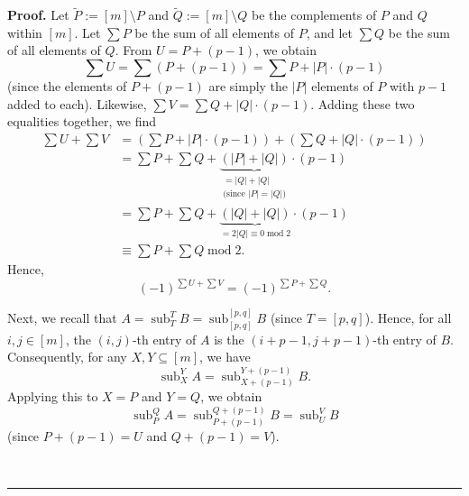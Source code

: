 \documentclass[numbers=enddot,12pt,final,onecolumn,notitlepage]{scrartcl}%
\theoremstyle{definition}
\newenvironment{proof}[1][Proof]{\noindent\textbf{#1.} }{\ \rule{0.5em}{0.5em}}
\let\sumnonlimits\sum
\renewcommand{\sum}{\sumnonlimits\limits}
\begin{document}
\begin{enumerate}
\begin{proof}
Let $\widetilde{P}:=\left[  m\right]  \setminus P$ and $\widetilde{Q}:=\left[
m\right]  \setminus Q$ be the complements of $P$ and $Q$ within $\left[
m\right]  $. Let $\sum P$ be the sum of all elements of $P$, and let $\sum Q$
be the sum of all elements of $Q$. From $U=P+\left(  p-1\right)  $, we obtain
\[
\sum U=\sum\left(  P+\left(  p-1\right)  \right)  =\sum P+\left\vert
P\right\vert \cdot\left(  p-1\right)
\]
(since the elements of $P+\left(  p-1\right)  $ are simply the $\left\vert
P\right\vert $ elements of $P$ with $p-1$ added to each). Likewise, $\sum
V=\sum Q+\left\vert Q\right\vert \cdot\left(  p-1\right)  $. Adding these two
equalities together, we find%
\begin{align*}
\sum U+\sum V  &  =\left(  \sum P+\left\vert P\right\vert \cdot\left(
p-1\right)  \right)  +\left(  \sum Q+\left\vert Q\right\vert \cdot\left(
p-1\right)  \right) \\
&  =\sum P+\sum Q+\underbrace{\left(  \left\vert P\right\vert +\left\vert
Q\right\vert \right)  }_{\substack{=\left\vert Q\right\vert +\left\vert
Q\right\vert \\\text{(since }\left\vert P\right\vert =\left\vert Q\right\vert
\text{)}}}\cdot\left(  p-1\right) \\
&  =\sum P+\sum Q+\underbrace{\left(  \left\vert Q\right\vert +\left\vert
Q\right\vert \right)  }_{=2\left\vert Q\right\vert \equiv0\operatorname{mod}%
2}\cdot\left(  p-1\right) \\
&  \equiv\sum P+\sum Q\operatorname{mod}2.
\end{align*}
Hence,%
\begin{equation}
\left(  -1\right)  ^{\sum U+\sum V}=\left(  -1\right)  ^{\sum P+\sum Q}.
\label{p17.lemA3.pf.sign}%
\end{equation}


Next, we recall that $A=\operatorname*{sub}\nolimits_{T}^{T}%
B=\operatorname*{sub}\nolimits_{\left[  p,q\right]  }^{\left[  p,q\right]  }B$
(since $T=\left[  p,q\right]  $). Hence, for all $i,j\in\left[  m\right]  $,
the $\left(  i,j\right)  $-th entry of $A$ is the $\left(  i+p-1,j+p-1\right)
$-th entry of $B$. Consequently, for any $X,Y\subseteq\left[  m\right]  $, we
have%
\[
\operatorname*{sub}\nolimits_{X}^{Y}A=\operatorname*{sub}\nolimits_{X+\left(
p-1\right)  }^{Y+\left(  p-1\right)  }B.
\]
Applying this to $X=P$ and $Y=Q$, we obtain%
\begin{equation}
\operatorname*{sub}\nolimits_{P}^{Q}A=\operatorname*{sub}\nolimits_{P+\left(
p-1\right)  }^{Q+\left(  p-1\right)  }B=\operatorname*{sub}\nolimits_{U}^{V}B
\label{p17.lemA3.pf.4}%
\end{equation}
(since $P+\left(  p-1\right)  =U$ and $Q+\left(  p-1\right)  =V$).


\end{proof}
\end{enumerate}
\end{document}
